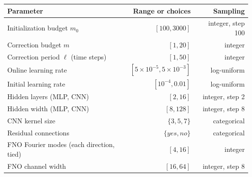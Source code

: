 \begin{tabular*}{\linewidth}{@{\extracolsep{\fill}}lrr@{}}
\toprule
Parameter & Range or choices & Sampling\\
\midrule
Initialization budget $m_0$ & $[100, 3000]$ & integer, step 100 \\
Correction budget $m$ & $[1, 20]$ & integer \\
Correction period $\ell$ (time steps) & $[1, 50]$ & integer \\
Online learning rate & $[5\times10^{-5}, 5\times10^{-3}]$ & log-uniform \\
Initial learning rate & $[10^{-4}, 0.01]$ & log-uniform \\
Hidden layers (MLP, CNN) & $[2, 16]$ & integer, step 2 \\
Hidden width (MLP, CNN) & $[8, 128]$ & integer, step 8 \\
CNN kernel size & $\{3, 5, 7\}$ & categorical \\
Residual connections & $\{yes, no\}$ & categorical \\
FNO Fourier modes (each direction, tied) & $[4, 16]$ & integer \\
FNO channel width & $[16, 64]$ & integer, step 8 \\
\bottomrule
\end{tabular*}
